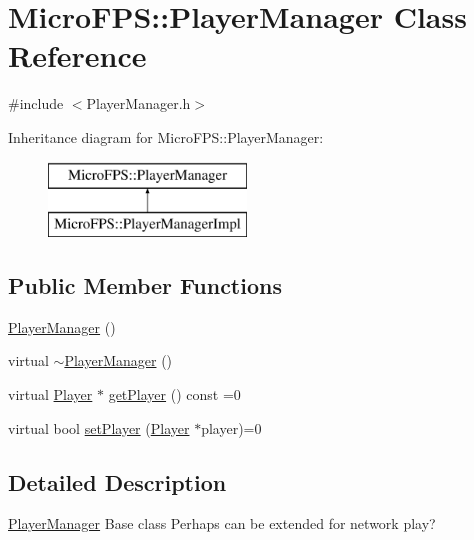 \hypertarget{class_micro_f_p_s_1_1_player_manager}{
\section{MicroFPS::PlayerManager Class Reference}
\label{d3/dcd/class_micro_f_p_s_1_1_player_manager}
}


{\ttfamily \#include $<$PlayerManager.h$>$}

Inheritance diagram for MicroFPS::PlayerManager:\begin{figure}[H]
\begin{center}
\leavevmode
\includegraphics[height=2.000000cm]{d3/dcd/class_micro_f_p_s_1_1_player_manager}
\end{center}
\end{figure}
\subsection*{Public Member Functions}
\begin{DoxyCompactItemize}
\item 
\hyperlink{class_micro_f_p_s_1_1_player_manager_a2922ff29dbd441e5b7bef2957db4eacf}{PlayerManager} ()
\item 
virtual \hyperlink{class_micro_f_p_s_1_1_player_manager_a14fd9979ab2c28450ab2e0ab814ad7d1}{$\sim$PlayerManager} ()
\item 
virtual \hyperlink{class_micro_f_p_s_1_1_player}{Player} $\ast$ \hyperlink{class_micro_f_p_s_1_1_player_manager_a5a9c131a145a444183b3483d563d4909}{getPlayer} () const =0
\item 
virtual bool \hyperlink{class_micro_f_p_s_1_1_player_manager_af0cce69401982b0d3a0a37b77e55879b}{setPlayer} (\hyperlink{class_micro_f_p_s_1_1_player}{Player} $\ast$player)=0
\end{DoxyCompactItemize}


\subsection{Detailed Description}
\hyperlink{class_micro_f_p_s_1_1_player_manager}{PlayerManager} Base class Perhaps can be extended for network play? 

